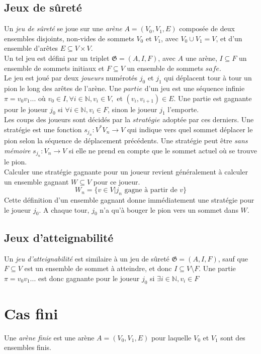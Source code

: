 \documentclass[12pt,a4paper,oneside, titlepage]{report}
\begin{document}
\section*{Jeux de sûreté}
Un \emph{jeu de sûreté} se joue sur une \emph{arène} $A = (V_0,V_1,E)$ composée de deux ensembles disjoints, non-vides de sommets $V_0$ et $V_1$, avec $V_0 \cup V_1 = V$, et d'un ensemble d'arêtes $E \subseteq V\times V$.\\
Un tel jeu est défini par un triplet $\mathfrak{G} = (A, I, F)$, avec $A$ une arène, $I\subseteq F$ un ensemble de sommets initiaux et $F\subseteq V$ un ensemble de sommets $safe$. \\
Le jeu est joué par deux \emph{joueurs} numérotés $j_0$ et $j_1$ qui déplacent tour à tour un pion le long des arêtes de l'arène. Une $partie$ d'un jeu est une séquence infinie $\pi=v_0 v_1 ...$ où $v_0\in I, \forall i\in \mathbb{N},v_i \in V, $ et $(v_i, v_{i+1})\in E$. Une partie est gagnante pour le joueur $j_0$ si $\forall i \in \mathbb{N}, v_i \in F$, sinon le joueur $j_1$ l'emporte.\\
Les coups des joueurs sont décidés par la $strat\text{é}gie$ adoptée par ces derniers. Une stratégie est une fonction $s_{j_n} : V^*V_n\to V$ qui indique vers quel sommet déplacer le pion selon la séquence de déplacement précédents.
Une stratégie peut être \emph{sans mémoire} $s_{j_n} : V_n \to V$ si elle ne prend en compte que le sommet actuel où se trouve le pion.\\
Calculer une stratégie gagnante pour un joueur revient généralement à calculer un ensemble gagnant $W\subseteq V$ pour ce joueur.
$$W_n=\{v\in V|j_n\text{ gagne à partir de }v\}$$
Cette définition d'un ensemble gagnant donne immédiatement une stratégie pour le joueur $j_0$. A chaque tour, $j_0$ n'a qu'à bouger le pion vers un sommet dans $W$.
\section*{Jeux d'atteignabilité}
Un \emph{jeu d'atteignabilité} est similaire à un jeu de sûreté $\mathfrak{G} = (A, I, F)$, sauf que $F \subseteq V$ est un ensemble de sommet à atteindre, et donc $I\subseteq V\setminus F$. Une partie $\pi=v_0v_1...$ est donc gagnante pour le joueur $j_0$ si $\exists i \in \mathbb{N}, v_i \in F$


\chapter{Cas fini}
\renewcommand{\leftmark}{CHAPITRE \thechapter.~~Cas fini}
Une \emph{arène finie} est une arène $A=(V_0, V_1, E)$ pour laquelle $V_0$ et $V_1$ sont des ensembles finis.
\end{document}
